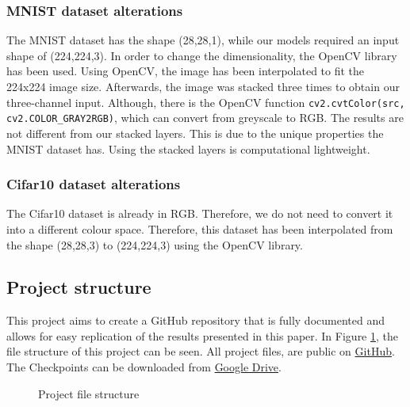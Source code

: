 \documentclass[conference]{IEEEtran}
\begin{document}
\subsubsection{MNIST dataset alterations}
The MNIST dataset has the shape (28,28,1), while our models required an input shape of (224,224,3). 
In order to change the dimensionality, the OpenCV library has been used. Using OpenCV, the image has been interpolated to fit the 224x224 image size. 
Afterwards, the image was stacked three times to obtain our three-channel input. Although, there is the OpenCV function \verb|cv2.cvtColor(src, cv2.COLOR_GRAY2RGB)|, 
which can convert from greyscale to RGB. The results are not different from our stacked layers. 
This is due to the unique properties the MNIST dataset has. Using the stacked layers is computational lightweight.

\subsubsection{Cifar10 dataset alterations}
The Cifar10 dataset is already in RGB. Therefore, we do not need to convert it into a different colour space. 
Therefore, this dataset has been interpolated from the shape (28,28,3) to (224,224,3) using the OpenCV library.

\subsection{Project structure}
This project aims to create a GitHub repository that is fully documented and allows for easy replication of the results presented in this paper. 
In Figure \ref{dir: file strucutre}, the file structure of this project can be seen.
All project files, are public on \href{https://github.com/devasworski/Deeper-Networks-for-Image-Classification}{GitHub}.
The Checkpoints can be downloaded from \href{https://drive.google.com/drive/folders/1fXxzepBOfI-so3I4ZbZv16Pux7InrMIv?usp=sharing}{Google Drive}.

\begin{figure}[!htbp]
\caption{Project file structure}
\label{dir: file strucutre}
\end{figure}
\end{document}
